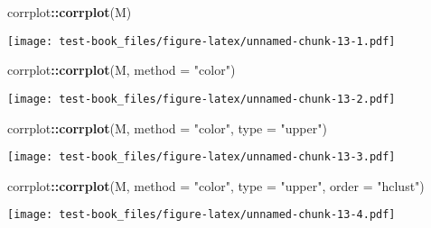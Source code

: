 \documentclass[]{book}
\newenvironment{Shaded}{\begin{snugshade}}{\end{snugshade}}
\newcommand{\DataTypeTok}[1]{\textcolor[rgb]{0.13,0.29,0.53}{#1}}
\newcommand{\KeywordTok}[1]{\textcolor[rgb]{0.13,0.29,0.53}{\textbf{#1}}}
\newcommand{\NormalTok}[1]{#1}
\newcommand{\OperatorTok}[1]{\textcolor[rgb]{0.81,0.36,0.00}{\textbf{#1}}}
\newcommand{\StringTok}[1]{\textcolor[rgb]{0.31,0.60,0.02}{#1}}
\begin{document}
\begin{Shaded}
\end{Shaded}

\begin{Shaded}
\begin{Highlighting}[]
\NormalTok{corrplot}\OperatorTok{::}\KeywordTok{corrplot}\NormalTok{(M)}
\end{Highlighting}
\end{Shaded}

\texttt{[image: test-book\_files/figure-latex/unnamed-chunk-13-1.pdf]}

\begin{Shaded}
\begin{Highlighting}[]
\NormalTok{corrplot}\OperatorTok{::}\KeywordTok{corrplot}\NormalTok{(M, }\DataTypeTok{method =} \StringTok{"color"}\NormalTok{)}
\end{Highlighting}
\end{Shaded}

\texttt{[image: test-book\_files/figure-latex/unnamed-chunk-13-2.pdf]}

\begin{Shaded}
\begin{Highlighting}[]
\NormalTok{corrplot}\OperatorTok{::}\KeywordTok{corrplot}\NormalTok{(M, }\DataTypeTok{method =} \StringTok{"color"}\NormalTok{, }\DataTypeTok{type =} \StringTok{"upper"}\NormalTok{)}
\end{Highlighting}
\end{Shaded}

\texttt{[image: test-book\_files/figure-latex/unnamed-chunk-13-3.pdf]}

\begin{Shaded}
\begin{Highlighting}[]
\NormalTok{corrplot}\OperatorTok{::}\KeywordTok{corrplot}\NormalTok{(M, }\DataTypeTok{method =} \StringTok{"color"}\NormalTok{, }\DataTypeTok{type =} \StringTok{"upper"}\NormalTok{, }\DataTypeTok{order =} \StringTok{"hclust"}\NormalTok{)}
\end{Highlighting}
\end{Shaded}

\texttt{[image: test-book\_files/figure-latex/unnamed-chunk-13-4.pdf]}
\end{document}
